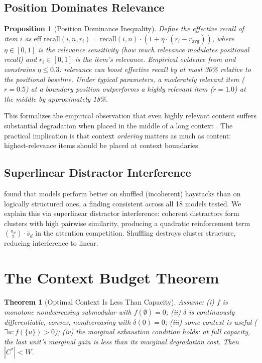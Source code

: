 \documentclass[11pt, a4paper, copyright]{googledeepmind}
\newtheorem{theorem}{Theorem}[section]
\newtheorem{proposition}{Proposition}[section]
\begin{document}
\subsection{Position Dominates Relevance}

\begin{proposition}[Position Dominance Inequality]
\label{prop:position}
Define the effective recall of item $i$ as $\text{eff\_recall}(i, n, r_i) = \text{recall}(i,n) \cdot (1 + \eta \cdot (r_i - r_{\text{avg}}))$, where $\eta \in [0,1]$ is the \emph{relevance sensitivity} (how much relevance modulates positional recall) and $r_i \in [0,1]$ is the item's relevance. Empirical evidence from \citet{du2025context} and \citet{chroma2025contextrot} constrains $\eta \leq 0.3$: relevance can boost effective recall by at most 30\% relative to the positional baseline. Under typical parameters, a moderately relevant item ($r = 0.5$) at a boundary position outperforms a highly relevant item ($r = 1.0$) at the middle by approximately 18\%.
\end{proposition}

This formalizes the empirical observation that even highly relevant content suffers substantial degradation when placed in the middle of a long context \citep{liu2024lost, du2025context}. The practical implication is that context \emph{ordering} matters as much as content: highest-relevance items should be placed at context boundaries.

\subsection{Superlinear Distractor Interference}

\citet{chroma2025contextrot} found that models perform better on shuffled (incoherent) haystacks than on logically structured ones, a finding consistent across all 18 models tested. We explain this via superlinear distractor interference: coherent distractors form clusters with high pairwise similarity, producing a quadratic reinforcement term $\binom{n_d}{2} \cdot \bar{s}_d$ in the attention competition. Shuffling destroys cluster structure, reducing interference to linear.


\section{The Context Budget Theorem}
\label{sec:budget}

\begin{theorem}[Optimal Context Is Less Than Capacity]
\label{thm:budget}
Assume: (i) $f$ is monotone nondecreasing submodular with $f(\emptyset) = 0$; (ii) $\delta$ is continuously differentiable, convex, nondecreasing with $\delta(0) = 0$; (iii) some context is useful ($\exists u: f(\{u\}) > 0$); (iv) the marginal exhaustion condition holds: at full capacity, the last unit's marginal gain is less than its marginal degradation cost. Then $|C^*| < W$.
\end{theorem}
\end{document}
